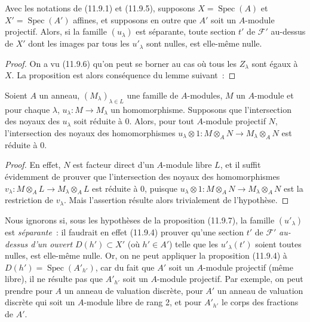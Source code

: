 \begin{proposition}[11.9.7]
\label{IV.11.9.7-fr}
Avec les notations de (11.9.1) et (11.9.5), supposons
$X=\operatorname{Spec}(A)$ et $X'=\operatorname{Spec}(A')$ affines, et
supposons en outre que $A'$ soit un $A$-module projectif. Alors, si la famille
$(u_\lambda)$ est séparante, toute section $t'$ de $\mathcal F'$ au-dessus de
$X'$ dont les images par tous les $u'_\lambda$ sont nulles, est elle-même
nulle.
\end{proposition}

\begin{proof}
On a vu (11.9.6) qu'on peut se borner au cas où tous les $Z_\lambda$ sont égaux
à $X$. La proposition est alors conséquence du lemme suivant~:
\end{proof}

\begin{lemma}[11.9.7.1]
\label{IV.11.9.7.1-fr}
Soient $A$ un anneau, $(M_\lambda)_{\lambda\in L}$ une famille de $A$-modules,
$M$ un $A$-module et pour chaque $\lambda$,
$u_\lambda:M\to M_\lambda$ un homomorphisme. Supposons que l'intersection des
noyaux des $u_\lambda$ soit réduite à 0. Alors, pour tout $A$-module projectif
$N$, l'intersection des noyaux des homomorphismes
$u_\lambda\otimes 1:M\otimes_A N\to M_\lambda\otimes_A N$ est réduite à 0.
\end{lemma}

\begin{proof}
En effet, $N$ est facteur direct d'un $A$-module libre $L$, et il suffit
évidemment de prouver que l'intersection des noyaux des homomorphismes
$v_\lambda:M\otimes_A L\to M_\lambda\otimes_A L$ est réduite à 0, puisque
$u_\lambda\otimes 1:M\otimes_A N\to M_\lambda\otimes_A N$ est la restriction
de $v_\lambda$. Mais l'assertion résulte alors trivialement de l'hypothèse.
\end{proof}

\begin{remark}[11.9.8]
\label{IV.11.9.8-fr}
Nous ignorons si, sous les hypothèses de la proposition (11.9.7), la famille
$(u'_\lambda)$ est \emph{séparante}~: il faudrait en effet (11.9.4) prouver
qu'une section $t'$ de $\mathcal F'$ \emph{au-dessus d'un ouvert}
$D(h')\subset X'$ (où $h'\in A'$) telle que les $u'_\lambda(t')$ soient toutes
nulles, est elle-même nulle. Or, on ne peut appliquer la proposition (11.9.4)
à $D(h')=\operatorname{Spec}(A'_{h'})$, car du fait que $A'$ soit un
$A$-module projectif (même libre), il ne résulte pas que $A'_{h'}$ soit un
$A$-module projectif. Par exemple, on peut prendre pour $A$ un anneau de
valuation discrète, pour $A'$ un anneau de valuation discrète qui soit un
$A$-module libre de rang 2, et pour $A'_{h'}$ le corps des fractions de $A'$.
\end{remark}

